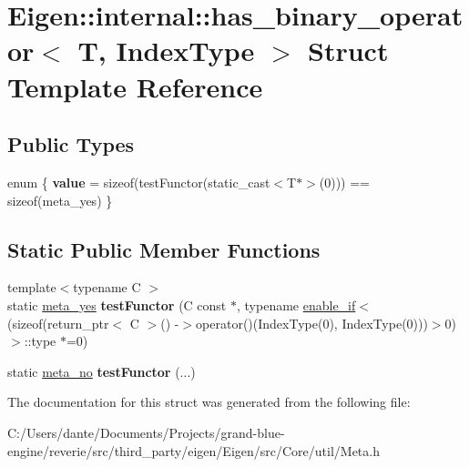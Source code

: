 \hypertarget{struct_eigen_1_1internal_1_1has__binary__operator}{}\section{Eigen\+::internal\+::has\+\_\+binary\+\_\+operator$<$ T, Index\+Type $>$ Struct Template Reference}
\label{struct_eigen_1_1internal_1_1has__binary__operator}
\subsection*{Public Types}
\begin{DoxyCompactItemize}
\item 
\mbox{\label{struct_eigen_1_1internal_1_1has__binary__operator_a0f96b230c70ebc1035b432e95b074f40}} 
enum \{ {\bfseries value} = sizeof(test\+Functor(static\+\_\+cast$<$T$\ast$$>$(0))) == sizeof(meta\+\_\+yes)
 \}
\end{DoxyCompactItemize}
\subsection*{Static Public Member Functions}
\begin{DoxyCompactItemize}
\item 
\mbox{\label{struct_eigen_1_1internal_1_1has__binary__operator_abf526f2d4d1c2606b3aca2e97cd29143}} 
{\footnotesize template$<$typename C $>$ }\\static \mbox{\hyperlink{struct_eigen_1_1internal_1_1meta__yes}{meta\+\_\+yes}} {\bfseries test\+Functor} (C const $\ast$, typename \mbox{\hyperlink{struct_eigen_1_1internal_1_1enable__if}{enable\+\_\+if}}$<$(sizeof(return\+\_\+ptr$<$ C $>$() -\/$>$operator()(Index\+Type(0), Index\+Type(0)))$>$0)$>$\+::type $\ast$=0)
\item 
\mbox{\label{struct_eigen_1_1internal_1_1has__binary__operator_a7c0f24b7478b7c0f456ae7f8bd9da4a3}} 
static \mbox{\hyperlink{struct_eigen_1_1internal_1_1meta__no}{meta\+\_\+no}} {\bfseries test\+Functor} (...)
\end{DoxyCompactItemize}


The documentation for this struct was generated from the following file\+:\begin{DoxyCompactItemize}
\item 
C\+:/\+Users/dante/\+Documents/\+Projects/grand-\/blue-\/engine/reverie/src/third\+\_\+party/eigen/\+Eigen/src/\+Core/util/Meta.\+h\end{DoxyCompactItemize}
